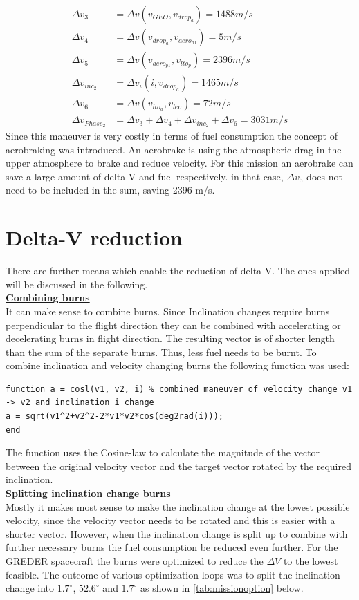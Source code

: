 \begin{align}
	\Delta v_3 &=\Delta v(v_{GEO}, v_{drop_a}) = 1488 m/s\\
	\Delta v_4 &=\Delta v(v_{drop_a}, v_{aero_{a1}}) = 5 m/s   \\
	\Delta v_5 &=\Delta v(v_{aero_{p1}}, v_{lto_p}) = 2396 m/s   \\
	\Delta v_{inc_2} &=\Delta v_i(i, v_{drop_a}) = 1465 m/s   \\
	\Delta v_6 &=\Delta v (v_{lto_a}, v_{leo}) = 72 m/s  \\
	\Delta v_{Phase_2} &= \Delta v_3 + \Delta v_4 + \Delta v_{inc_2} + \Delta v_6 =3031 m/s
\end{align}
Since this maneuver is very costly in terms of fuel consumption the concept of aerobraking was
introduced. An aerobrake is using the atmospheric drag in the upper atmosphere to brake and reduce
velocity. For this mission an aerobrake can save a large amount of delta-V and fuel respectively. in that case, $\Delta v_5$ does not need to be included in the sum, saving 2396 m/s.

\section{Delta-V reduction}
There are further means which enable the reduction of delta-V. The ones applied will be discussed in the
following.\\

\textbf{\underline{Combining burns}}\\
It can make sense to combine burns. Since Inclination changes require burns perpendicular to the flight
direction they can be combined with accelerating or decelerating burns in flight direction. The resulting vector is of shorter length than the sum of the separate burns. Thus, less fuel needs to be burnt. To combine inclination and velocity changing burns the following function was used:
\begin{verbatim}
function a = cosl(v1, v2, i) % combined maneuver of velocity change v1 -> v2 and inclination i change
a = sqrt(v1^2+v2^2-2*v1*v2*cos(deg2rad(i)));
end
\end{verbatim}

The function uses the Cosine-law to calculate the magnitude of the vector between the original velocity
vector and the target vector rotated by the required inclination.\\

\textbf{\underline{Splitting inclination change burns}}\\
Mostly it makes most sense to make the inclination change at the lowest possible velocity, since the
velocity vector needs to be rotated and this is easier with a shorter vector. However, when the inclination change is split up to combine with further necessary burns the fuel consumption be reduced even further. For the GREDER spacecraft the burns were optimized to reduce the $\Delta V$ to the lowest feasible. The outcome of various optimization loops was to split the inclination change into $1.7^\circ$, $52.6^\circ$ and $1.7^\circ$ as shown in \autoref{tab:missionoption} below.\\

